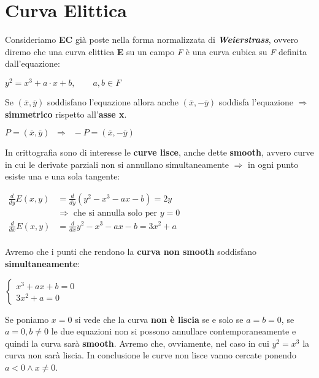 \section{Curva Elittica}
Consideriamo \textbf{EC} già poste nella forma normalizzata di \textbf{\textit{Weierstrass}}, ovvero diremo che una curva elittica \textbf{E} su un campo \textit{F} è una curva cubica su \textit{F} definita dall'equazione:
\begin{center}
    $y^2 = x^3 + a \cdot x + b, \qquad a, b \in F$
\end{center}
Se $(\overline{x}, \overline{y})$ soddisfano l'equazione allora anche $(\overline{x}, -\overline{y})$ soddisfa l'equazione $\Rightarrow$ \textbf{simmetrico} rispetto all'\textbf{asse x}.
\begin{center}
    $P = (\overline{x}, \overline{y})\;\;\Rightarrow\;\;-P = (\overline{x}, -\overline{y})$
\end{center}
In crittografia sono di interesse le \textbf{curve lisce}, anche dette \textbf{smooth}, avvero curve in cui le derivate parziali non si annullano simultaneamente $\Rightarrow$ in ogni punto esiste una e una sola tangente:
\begin{center}
    \begin{math}
        \begin{aligned}
            \frac{d}{dy}E(x, y) &= \frac{d}{dy}(y^2 - x^3 - ax - b) = 2y \\
            &\Rightarrow \text{ che si annulla solo per } y = 0 \\
            \frac{d}{dx}E(x, y) &= \frac{d}{dx}{y^2 - x^3 - ax - b} = 3x^2 + a \\
        \end{aligned}
    \end{math}
\end{center}
Avremo che i punti che rendono la \textbf{curva non smooth} soddisfano \textbf{simultaneamente}:
\begin{center}
    \begin{math}
        \begin{cases}
            x^3 + ax + b = 0 \\
            3x^2 + a = 0    
        \end{cases}
    \end{math}
\end{center}
Se poniamo $x = 0$ si vede che la curva \textbf{non è liscia} se e solo se $a = b = 0$, se $a = 0, b \neq 0$ le due equazioni non si possono annullare contemporaneamente e quindi la curva sarà \textbf{smooth}. Avremo che, ovviamente, nel caso in cui $y^2 = x^3$ la curva non sarà liscia. In conclusione le curve non lisce vanno cercate ponendo $a < 0 \land x \neq 0$.
